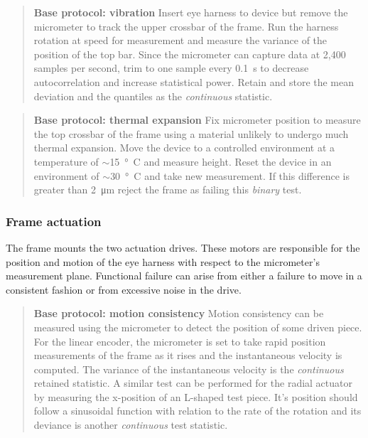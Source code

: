 \documentclass{article}
\begin{document}
\begin{quotation}
  \textbf{Base protocol: vibration} Insert eye harness to device but   remove the micrometer to track the upper crossbar of the frame. Run   the harness rotation at speed for measurement and measure the   variance of the position of the top bar. Since the micrometer can   capture data at 2,400 samples per second, trim to one sample every   \SI{0.1}{\second} to decrease autocorrelation and increase   statistical power. Retain and store the mean deviation and the   quantiles as the \textit{continuous} statistic.
\end{quotation}

\begin{quotation}
  \textbf{Base protocol: thermal expansion} Fix micrometer position to   measure the top crossbar of the frame using a material unlikely to   undergo much thermal expansion. Move the device to a controlled   environment at a temperature of $\sim$\SI{15}{\degree C} and measure   height. Reset the device in an environment of $\sim$\SI{30}{\degree     C} and take new measurement. If this difference is greater than   \SI{2}{\micro m} reject the frame as failing this \textit{binary} test.
\end{quotation}


\subsubsection{Frame actuation}
The frame mounts the two actuation drives. These motors are responsible for the position and motion of the eye harness with respect to the micrometer's measurement plane. Functional failure can arise from either a failure to move in a consistent fashion or from excessive noise in the drive.

\begin{quotation}
  \textbf{Base protocol: motion consistency} Motion consistency can be measured using the micrometer to detect the position of some driven piece. For the linear encoder, the micrometer is set to take rapid position measurements of the frame as it rises and the instantaneous velocity is computed. The variance of the instantaneous velocity is the \textit{continuous} retained statistic. A similar test can be performed for the radial actuator by measuring the x-position of an L-shaped test piece. It's position should follow a sinusoidal function with relation to the rate of the rotation and its deviance is another \textit{continuous} test statistic.
\end{quotation}
\end{document}
